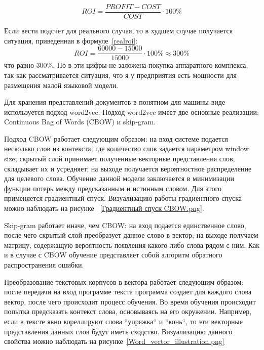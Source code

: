 \begin{equation} \label{roi}
    ROI = \frac{PROFIT - COST}{COST} \cdot 100\%
\end{equation}

Если вести подсчет для реального случая, то в худшем случае получается ситуация,
приведенная в формуле~\ref{realroi}:
\begin{equation} \label{realroi}
    ROI = \frac{60000 - 15000}{15000} \cdot 100\% \approx 300\%
\end{equation}
что равно $300\%$. Но в эти цифры не заложена покупка аппаратного комплекса, 
так как рассматривается ситуация, что я у предприятия есть мощности для 
размещения малой языковой модели.


Для хранения представлений документов в понятном для машины виде используется
подход word2vec.
Подход word2vec имеет две основные реализации: Continuous Bag of Words (CBOW)
и skip-gram.

Подход CBOW работает следующим образом: на вход системе подается несколько слов
из контекста, где количество слов задается параметром window size; скрытый слой
принимает полученные векторные представления слов, складывает их и усредняет;
на выходе получается вероятностное распределение для целевого слова.
Обучение данной модели заключается в минимизации функции потерь между
предсказанным и истинным словом. Для этого применяется градиентный спуск.
Визуализацию работы градиентного спуска можно наблюдать на рисунке
~\ref{Градиентный спуск CBOW.png}.


Skip-gram работает иначе, чем CBOW\@: на вход подается единственное слово, после
чего скрытый слой преобразует данное слово в вектор; на выходе получаем
матрицу, содержащую вероятность появления какого-либо слова рядом с ним. 
Как и в случае с CBOW обучение представляет собой алгоритм обратного 
распространения ошибки.

Преобразование текстовых корпусов в вектора работает следующим образом:
после передачи на вход программе текста программа создает для каждого слова
вектор, после чего происходит процесс обучения. Во время обучения происходит
попытка предсказать контекст слова, основываясь на его окружении. Например,
если в тексте явно кореллируют слова ``упряжка`` и ``конь``, то эти векторные
представления данных слов будут иметь сходство. Визуализацию данного свойства
можно наблюдать на рисунке~\ref{Word_vector_illustration.png}

